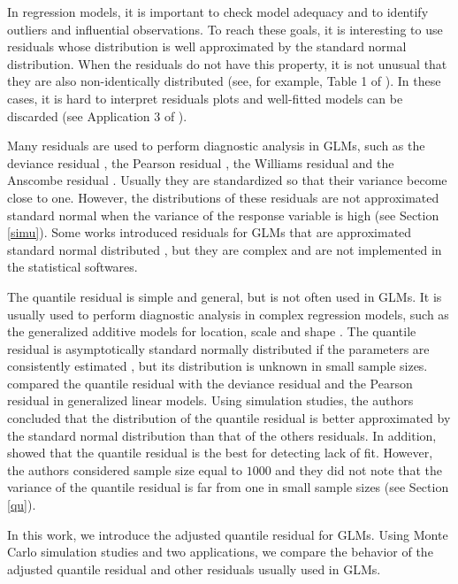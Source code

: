 \documentclass[11pt,authoryear,review,3p,times]{elsarticle}
\begin{document}
In regression models, it is important to check model adequacy and to identify outliers and influential observations. To reach these goals, it is interesting to use residuals whose distribution is well approximated by the standard normal distribution. When the residuals do not have this property, it is not unusual that they are also non-identically distributed (see, for example, Table 1 of \cite{anholeto2014}). In these cases, it is hard to interpret residuals plots and well-fitted models can be discarded (see Application 3 of \cite{pereira2017quantile}).

Many residuals are used to perform diagnostic analysis in GLMs, such as the deviance residual \citep{davison}, the Pearson residual \citep{mccullagh}, the Williams residual \citep{williams} and the Anscombe residual \citep{pierce1986residuals}. Usually they are standardized so that their variance become close to one.
However, the distributions of these residuals are not approximated standard normal when the variance of the response variable is high (see Section \ref{simu}).
Some works introduced residuals for GLMs that are approximated standard normal distributed \citep{cordeiro2004pearson,urbano2012wald}, but they are complex and are not implemented in the statistical softwares. 

The quantile residual \citep{dunn} is simple and general, but is not often used in GLMs. It is usually used to perform diagnostic analysis in complex regression models, such as the generalized additive models for location, scale and shape \citep{rigby2005}. The quantile residual is asymptotically standard normally distributed if the parameters are consistently estimated \citep{dunn}, but its distribution is unknown in small sample sizes. \cite{feng2017randomized} compared the quantile residual with the deviance residual and the Pearson residual in generalized linear models. Using simulation studies, the authors concluded that the distribution of the quantile residual is better approximated by the standard normal distribution than that of the others residuals. In addition, \cite{feng2017randomized} showed that the quantile residual is the best for detecting lack of fit. However, the authors considered sample size equal to $1000$ and they did not note that the variance of the quantile residual is far from one in small sample sizes (see Section \ref{qu}).

In this work, we introduce the adjusted quantile residual for GLMs. Using Monte Carlo simulation studies and two applications, we compare
the behavior of the adjusted quantile residual and other residuals usually used in GLMs.
\end{document}

